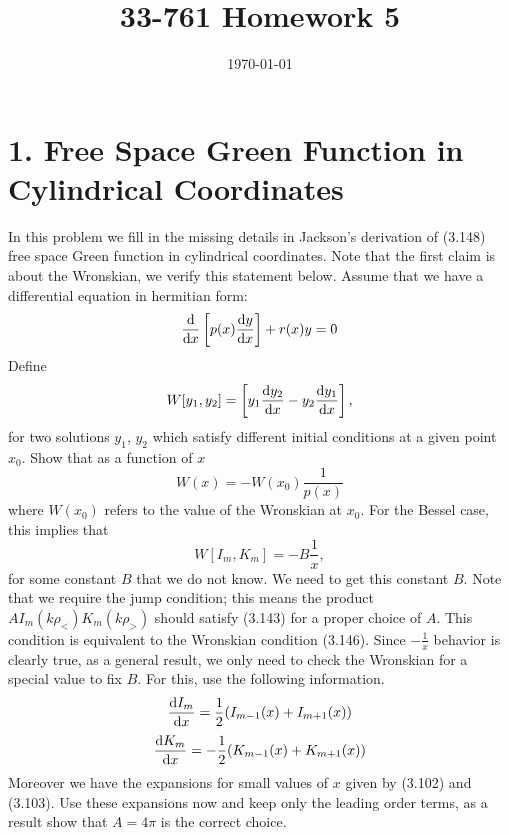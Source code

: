 \documentclass[a4paper,twoside]{article}
\title{33-761 Homework 5}
\date{\today}
\begin{document}
\maketitle

\section*{1. Free Space Green Function in Cylindrical Coordinates}
In this problem we fill in the missing details in Jackson’s derivation of (3.148) free space Green function in cylindrical coordinates. Note that the first claim is about the Wronskian, we verify this statement below. Assume that we have a differential equation in hermitian form:
\begin{equation}
    \label{eq:diffeq}
    \dv{x}\left[ p(x) \dv{y}{x} \right] + r(x)y = 0
\end{equation}
Define
\begin{equation}
    W[y_1,y_2] = \left[ y_1 \dv{y_2}{x} - y_2 \dv{y_1}{x} \right],
\end{equation}
for two solutions $ y_1 $, $ y_2 $ which satisfy different initial conditions at a given point $ x_0 $. Show that as a function of $ x $
\begin{equation}
    W(x) = -W(x_0) \frac{1}{p(x)} 
\end{equation}
where $ W(x_0) $ refers to the value of the Wronskian at $ x_0 $. For the Bessel case, this implies that
\begin{equation}
    W[I_m,K_m] = -B \frac{1}{x},
\end{equation}
for some constant $ B $ that we do not know. We need to get this constant $ B $. Note that we require the jump condition; this means the product $ A I_m(k \rho_<)K_m(k \rho_>) $ should satisfy (3.143) for a proper choice of $ A $. This condition is equivalent to the Wronskian condition (3.146). Since $ - \frac{1}{x} $ behavior is clearly true, as a general result, we only need to check the Wronskian for a special value to fix $ B $. For this, use the following information.
\begin{equation}
    \dv{I_m}{x} = \frac{1}{2} (I_{m-1} (x) + I_{m+1} (x))
\end{equation}
\begin{equation}
    \dv{K_m}{x} = -\frac{1}{2} (K_{m-1} (x) + K_{m+1} (x))
\end{equation}
Moreover we have the expansions for small values of $ x $ given by (3.102) and (3.103). Use these expansions now and keep only the leading order terms, as a result show that $ A = 4 \pi $ is the correct choice.
\end{document}
